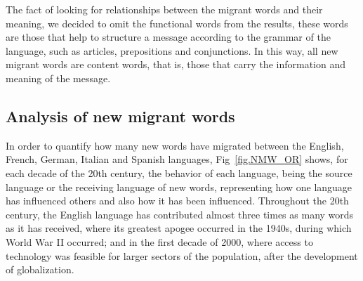 \documentclass[10pt,letterpaper]{article} %
\begin{document}

The fact of looking for relationships between the migrant words and their
meaning, we decided to omit the functional words from the results, these words
are those that help to structure a message according to the grammar of the
language, such as articles, prepositions and conjunctions. In this way, all new
migrant words are content words, that is, those that carry the information and
meaning of the message.
\subsection*{Analysis of new migrant words} %

In order to quantify how many new words have migrated between the English,
French, German, Italian and Spanish languages, Fig~\ref{fig.NMW_OR} shows, for
each decade of the 20th century, the behavior of each language, being the
source language or the receiving language of new words, representing how one
language has influenced others and also how it has been influenced. Throughout
the 20th century, the English language has contributed almost three times as
many words as it has received, where its greatest apogee occurred in the
1940s, during which World War II occurred; and in the first decade of 2000,
where access to technology was feasible for larger sectors of the population,
after the development of globalization.
\end{document}
